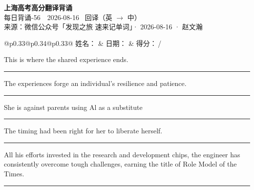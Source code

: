 \documentclass[11pt,a4paper]{article}
\newcommand{\num}[1]{\makebox[1.9em][r]{#1.}\hspace{0.3em}}
\newcommand{\wline}{\noindent\rule{\linewidth}{0.4pt}}
\begin{document}
\pagestyle{plain}
\begin{center}
{\LARGE\bfseries 上海高考高分翻译背诵 }\\[0.25em]
{\large 每日背诵-56　2026-08-16 \quad\ 回译（英 $\to$ 中）}\\[0.35em]
{\footnotesize 来源：微信公众号「发现之旅 速来记单词」· 2026-08-16 · 赵文瀚}
\end{center}

\vspace{0.4em}
\noindent\begin{tabular}{@{}p{0.33\textwidth}@{}p{0.34\textwidth}@{}p{0.33\textwidth}@{}}
姓名：\underline{\hspace{2.0cm}} & 日期：\underline{\hspace{2.0cm}} & 得分：\underline{\hspace{1.4cm}}\,/ \\
\end{tabular}

\vspace{0.5em}

\vspace{0.8em}
\num{1}This is where the shared experience ends.

\vspace{0.25em}

\wline

\num{2}The experiences forge an individual's resilience and patience.

\vspace{0.25em}

\wline

\num{3}She is against parents using Al as a substitute

\vspace{0.25em}

\wline

\num{4}The timing had been right for her to liberate herself.

\vspace{0.25em}

\wline

\num{5}All his efforts invested in the research and development chips, the engineer has consistently overcome tough challenges, earning the title of Role Model of the Times.

\vspace{0.25em}

\wline
\end{document}
